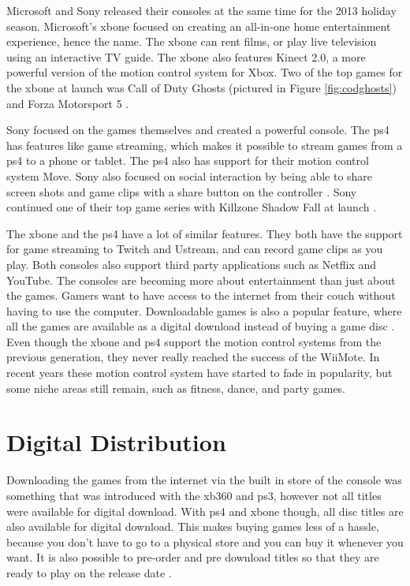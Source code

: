 
Microsoft and Sony released their consoles at the same time for the 2013 holiday season. Microsoft's \gls{xbone} focused on creating an all-in-one home entertainment experience, hence the name. The \gls{xbone} can rent films, or play live television using an interactive TV guide. The \gls{xbone} also features Kinect 2.0, a more powerful version of the motion control system for Xbox. Two of the top games for the \gls{xbone} at launch was Call of Duty Ghosts (pictured in Figure \ref{fig:codghosts}) and Forza Motorsport 5 \cite{2013independent}.

Sony focused on the games themselves and created a powerful console. The \gls{ps4} has features like game streaming, which makes it possible to stream games from a \gls{ps4} to a phone or tablet. The \gls{ps4} also has support for their motion control system Move. Sony also focused on social interaction by being able to share screen shots and game clips with a share button on the controller \cite{2013sony}. Sony continued one of their top game series with Killzone Shadow Fall at launch \cite{2013kotaku}.

The \gls{xbone} and the \gls{ps4} have a lot of similar features. They both have the support for game streaming to Twitch and Ustream, and can record game clips as you play. Both consoles also support third party applications such as Netflix and YouTube. The consoles are becoming more about entertainment than just about the games. Gamers want to have access to the internet from their couch without having to use the computer. Downloadable games is also a popular feature, where all the games are available as a digital download instead of buying a game disc \cite{2015ign}. Even though the \gls{xbone} and \gls{ps4} support the motion control systems from the previous generation, they never really reached the success of the WiiMote. In recent years these motion control system have started to fade in popularity, but some niche areas still remain, such as fitness, dance, and party games. \cite{2015gameon, 2014hardcore, 2014sciencebeta}


\section{Digital Distribution}
Downloading the games from the internet via the built in store of the console was something that was introduced with the \gls{xb360} and \gls{ps3}, however not all titles were available for digital download. With \gls{ps4} and \gls{xbone} though, all disc titles are also available for digital download. This makes buying games less of a hassle, because you don't have to go to a physical store and you can buy it whenever you want. It is also possible to pre-order and pre download titles so that they are ready to play on the release date \cite{2015msstore, 2015psstore}.

